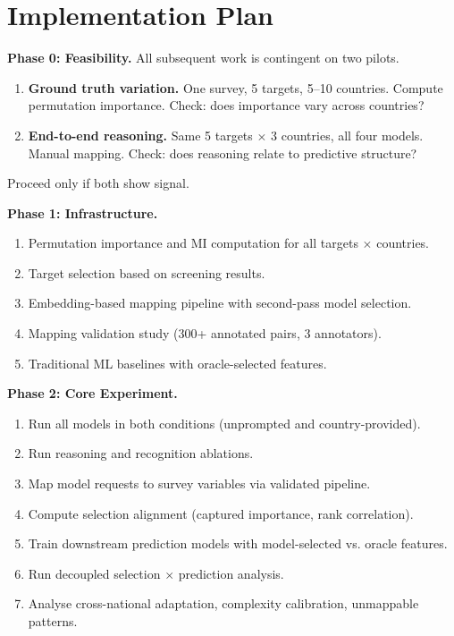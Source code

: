 \documentclass[11pt]{article}
\begin{document}
\section{Implementation Plan}
\label{sec:pilot}

\textbf{Phase 0: Feasibility.} All subsequent work is contingent on two pilots.

\begin{enumerate}[noitemsep]
    \item[0a.] \textbf{Ground truth variation.} One survey, 5 targets, 5--10 countries. Compute permutation importance. Check: does importance vary across countries?
    \item[0b.] \textbf{End-to-end reasoning.} Same 5 targets $\times$ 3 countries, all four models. Manual mapping. Check: does reasoning relate to predictive structure?
\end{enumerate}

Proceed only if both show signal.

\textbf{Phase 1: Infrastructure.}

\begin{enumerate}[noitemsep]
    \item Permutation importance and MI computation for all targets $\times$ countries.
    \item Target selection based on screening results.
    \item Embedding-based mapping pipeline with second-pass model selection.
    \item Mapping validation study (300+ annotated pairs, 3 annotators).
    \item Traditional ML baselines with oracle-selected features.
\end{enumerate}

\textbf{Phase 2: Core Experiment.}

\begin{enumerate}[noitemsep]
    \item Run all models in both conditions (unprompted and country-provided).
    \item Run reasoning and recognition ablations.
    \item Map model requests to survey variables via validated pipeline.
    \item Compute selection alignment (captured importance, rank correlation).
    \item Train downstream prediction models with model-selected vs. oracle features.
    \item Run decoupled selection $\times$ prediction analysis.
    \item Analyse cross-national adaptation, complexity calibration, unmappable patterns.
\end{enumerate}
\end{document}

